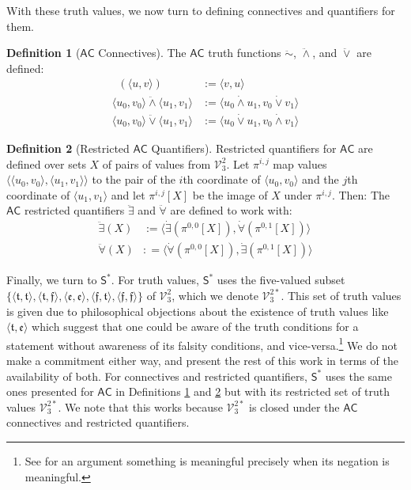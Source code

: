 \documentclass[letterpaper]{article} %
\theoremstyle{definition}
\theoremstyle{definition}
\newtheorem{definition}{Definition}
\theoremstyle{definition}
\theoremstyle{definition}
\theoremstyle{definition}
\newcommand{\strongneg}{\mathord{\sim}}
\newcommand{\vt}{\mathfrak{t}}
\newcommand{\vf}{\mathfrak{f}}
\newcommand{\vu}{\mathfrak{e}}
\begin{document}
With these truth values, we now turn to defining connectives and quantifiers for them.
\begin{definition}[$\mathsf{AC}$ Connectives]\label{def:AC-connectives}
The $\mathsf{AC}$ truth functions $\ddot{\strongneg}$, $\ddot{\wedge}$, and $\ddot{\vee}$ are defined:
	\begin{align*}
	    \mathop{\ddot{\strongneg}}(\langle u,v\rangle)&:=\langle v,u\rangle \\
		\langle u_{0},v_{0}\rangle\mathrel{\ddot{\wedge}}\langle u_{1},v_{1}\rangle&:=\langle u_{0}\mathrel{\dot{\wedge}}u_{1}, v_{0}\mathrel{\dot{\vee}}v_{1}\rangle \\
		\langle u_{0},v_{0}\rangle\mathrel{\ddot{\vee}}\langle u_{1},v_{1}\rangle&:=\langle u_{0}\mathrel{\dot{\vee}}u_{1}, v_{0}\mathrel{\dot{\wedge}}v_{1}\rangle 
	\end{align*}
\end{definition}
\begin{definition}[Restricted $\mathsf{AC}$ Quantifiers]\label{def:AC-quantifiers}
Restricted quantifiers for $\mathsf{AC}$ are defined over sets $X$ of pairs of values from $\mathcal{V}^{2}_{3}$. Let $\pi^{i,j}$ map values $\langle\langle u_{0},v_{0}\rangle,\langle u_{1},v_{1}\rangle\rangle$ to the pair of the $i$th coordinate of $\langle u_{0},v_{0}\rangle$ and the $j$th coordinate of $\langle u_{1},v_{1}\rangle$ and let $\pi^{i,j}[X]$ be the image of $X$ under $\pi^{i,j}$. Then:
The $\mathsf{AC}$ restricted quantifiers $\ddot{\exists}$ and $\ddot{\forall}$ are defined to work with:
	\begin{align*}
		\ddot{\exists}(X)&:=\langle \dot{\exists} (\pi^{0,0}[X]),\dot{\forall}(\pi^{0,1}[X])\rangle \\
		\ddot{\forall}(X)&: =\langle \dot{\forall} (\pi^{0,0}[X]),\dot{\exists}(\pi^{0,1}[X])\rangle
	\end{align*}
\end{definition}
\noindent Finally, we turn to $\mathsf{S}^*$. For truth values, $\mathsf{S}^*$ uses the five-valued subset $\{\langle \vt, \vt \rangle, \langle\vt,\vf\rangle,\langle\vu,\vu\rangle,\langle\vf,\vt\rangle,\langle \vf, \vf \rangle\}$ of $\mathcal{V}_3^{2}$, which we denote $\mathcal{V}_3^{2*}$. This set of truth values is given due to philosophical objections about the existence of truth values like $\langle \vt, \vu \rangle$ which suggest that one could be aware of the truth conditions for a statement without awareness of its falsity conditions, and vice-versa.\footnote{See \cite{b108fe03530e4bd0ab883a7a5c2b5cf2} for an argument something is meaningful precisely when its negation is meaningful.} We do not make a commitment either way, and present the rest of this work in terms of the availability of both. For connectives and restricted quantifiers, $\mathsf{S}^*$ uses the same ones presented for $\mathsf{AC}$ in Definitions \ref{def:AC-connectives} and \ref{def:AC-quantifiers} but with its restricted set of truth values $\mathcal{V}_3^{2*}$. We note that this works because $\mathcal{V}_3^{2*}$ is closed under the $\mathsf{AC}$ connectives and restricted quantifiers.
\end{document}
